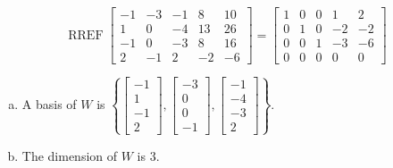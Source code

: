 \begin{exerciseAnswer} 


\[\operatorname{RREF} \left[\begin{array}{ccccc}
-1 & -3 & -1 & 8 & 10 \\
1 & 0 & -4 & 13 & 26 \\
-1 & 0 & -3 & 8 & 16 \\
2 & -1 & 2 & -2 & -6
\end{array}\right] = \left[\begin{array}{ccccc}
1 & 0 & 0 & 1 & 2 \\
0 & 1 & 0 & -2 & -2 \\
0 & 0 & 1 & -3 & -6 \\
0 & 0 & 0 & 0 & 0
\end{array}\right] \]


\begin{enumerate}[(a)]
\item A basis of \(W\) is \( \left\{ \left[\begin{array}{c}
-1 \\
1 \\
-1 \\
2
\end{array}\right] , \left[\begin{array}{c}
-3 \\
0 \\
0 \\
-1
\end{array}\right] , \left[\begin{array}{c}
-1 \\
-4 \\
-3 \\
2
\end{array}\right] \right\} \).
\item The dimension of \(W\) is \( 3 \).
\end{enumerate}
    
\end{exerciseAnswer}
    
